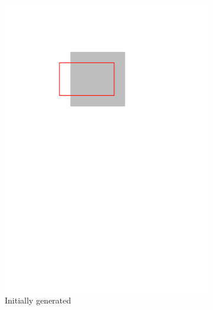 \documentclass[english,gradu]{tktltiki2018}
\begin{document}
\begin{figure}\centering
	\begin{subfigure}[t]{0.3\textwidth}\centering
		\includegraphics[width=\textwidth,page=2]{fig/filter}
		\caption{Initially generated \addEs}
	\end{subfigure}
	\hfil
	\begin{subfigure}[t]{0.3\textwidth}\centering

\end{subfigure}
\end{figure}
\end{document}

